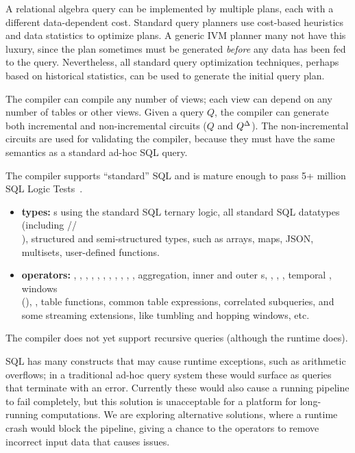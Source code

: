 A relational algebra query can be implemented by multiple plans, each
with a different data-dependent cost.  Standard query planners use
cost-based heuristics and data statistics to optimize plans.  A
generic IVM planner many not have this luxury, since the plan
sometimes must be generated \emph{before} any data has been fed to the
query.  Nevertheless, all standard query optimization techniques,
perhaps based on historical statistics, can be used to generate the
initial query plan.

The compiler can compile any number of views; each view can depend on
any number of tables or other views.  Given a query $Q$, the compiler
can generate both incremental and non-incremental circuits ($Q$ and
${Q}^{\Delta}$).  The non-incremental circuits are used for validating the
compiler, because they must have the same semantics as a standard
ad-hoc SQL query.

The compiler supports ``standard'' SQL and is mature enough to pass
5+ million SQL Logic Tests~\cite{sqllogictest}.
\begin{itemize}
\item \textbf{types:} s using the standard SQL ternary
  logic, all standard SQL datatypes (including
  //\\), structured and
  semi-structured types, such as arrays, maps, JSON, multisets,
  user-defined functions.
\item \textbf{operators:} , , ,
  ,  , ,
  , , , ,
  , aggregation, inner and outer s,
  , , , temporal ,
  windows \\ (), , table
  functions, common table expressions, correlated subqueries, and some
  streaming extensions, like tumbling and hopping windows, etc.
\end{itemize}
The compiler does not yet support recursive queries (although the
runtime does).

SQL has many constructs that may cause runtime exceptions, such as
arithmetic overflows; in a traditional ad-hoc query system these
would surface as queries that terminate with an error.  Currently
these would also cause a running pipeline to fail completely, but this
solution is unacceptable for a platform for long-running computations.
We are exploring alternative solutions, where a runtime crash would
block the pipeline, giving a chance to the operators to remove
incorrect input data that causes issues.

